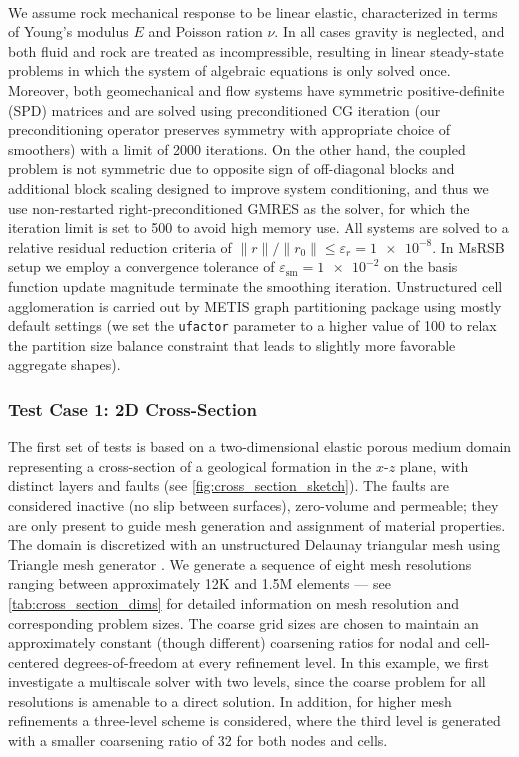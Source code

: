 \paragraph{}
We assume rock mechanical response to be linear elastic, characterized in terms of Young's modulus $E$ and Poisson ration $\nu$.   In all cases gravity is neglected, and both fluid and rock are treated as incompressible, resulting in linear steady-state problems in which the system of algebraic equations is only solved once.   Moreover, both geomechanical and flow systems have symmetric positive-definite (SPD) matrices and are solved using preconditioned CG iteration (our preconditioning operator preserves symmetry with appropriate choice of smoothers) with a limit of 2000 iterations.   On the other hand, the coupled problem is not symmetric due to opposite sign of off-diagonal blocks and additional block scaling designed to improve system conditioning, and thus we use non-restarted right-preconditioned GMRES as the solver, for which the iteration limit is set to 500 to avoid high memory use.   All systems are solved to a relative residual reduction criteria of $\|r\|/\|r_0\| \leq \varepsilon_r = \num{1e-8}$.   In MsRSB setup we employ a convergence tolerance of $\varepsilon_{\text{sm}} = \num{1e-2}$ on the basis function update magnitude terminate the smoothing iteration.    Unstructured cell agglomeration is carried out by METIS \cite{Karypis1999} graph partitioning package using mostly default settings (we set the \texttt{ufactor} parameter to a higher value of 100 to relax the partition size balance constraint that leads to slightly more favorable aggregate shapes).

\subsubsection{Test Case 1: 2D Cross-Section}

The first set of tests is based on a two-dimensional elastic porous medium domain representing a cross-section of a geological formation in the $x$-$z$ plane, with distinct layers and faults (see \cref{fig:cross_section_sketch}).   The faults are considered inactive (no slip between surfaces), zero-volume and permeable; they are only present to guide mesh generation and assignment of material properties.   The domain is discretized with an unstructured Delaunay triangular mesh using Triangle mesh generator \cite{Shewchuk1996}.   We generate a sequence of eight mesh resolutions ranging between approximately 12K and 1.5M elements --- see \cref{tab:cross_section_dims} for detailed information on mesh resolution and corresponding problem sizes.   The coarse grid sizes are chosen to maintain an approximately constant (though different) coarsening ratios for nodal and cell-centered degrees-of-freedom at every refinement level.   In this example, we first investigate a multiscale solver with two levels, since the coarse problem for all resolutions is amenable to a direct solution.   In addition, for higher mesh refinements a three-level scheme is considered, where the third level is generated with a smaller coarsening ratio of 32 for both nodes and cells.


